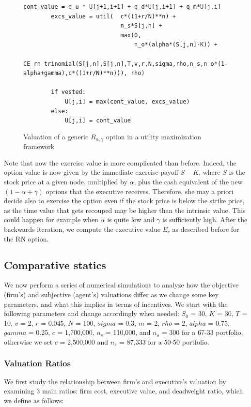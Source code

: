 \begin{figure}[H]
    \begin{lstlisting}[breaklines, basicstyle=\ttfamily\small]
        cont_value = q_u * U[j+1,i+1] + q_d*U[j,i+1] + q_m*U[j,i]
        excs_value = util(  c*((1+r/N)**n) +              
                            n_s*S[j,n] + 
                            max(0, 
                                n_o*(alpha*(S[j,n]-K)) + 
                                CE_rn_trinomial(S[j,n],S[j,n],T,v,r,N,sigma,rho,n_s,n_o*(1-alpha+gamma),c*((1+r/N)**n))), rho)

        if vested:
            U[j,i] = max(cont_value, excs_value)
        else: 
            U[j,i] = cont_value
    \end{lstlisting}
    \caption{Valuation of a generic $R_{\alpha, \gamma}$ option in a utility maximization framework}
    \label{fig:ce_exec_r}
\end{figure}



Note that now the exercise value is more complicated than before. Indeed, the option value is now given by the immediate exercise payoff $S-K$, where $S$ is the stock price at a given node, multiplied by $\alpha$, plus the cash equivalent of the new $(1-\alpha+\gamma)$ options that the executive receives. Therefore, she may a priori decide also to exercise the option even if the stock price is below the strike price, as the time value that gets recouped may be higher than the intrinsic value. This could happen for example when $\alpha$ is quite low and $\gamma$ is sufficiently high. 
After the backwards iteration, we compute the executive value $E_c$ as described before for the RN option.

\subsection{Comparative statics}
We now perform a series of numerical simulations to analyze how the objective (firm's) and subjective (agent's) valuations differ as we change some key parameters, and what this implies in terms of incentives. We start with the following parameters and change accordingly when needed: $S_0$ = 30, $K$ = 30, $T$ = 10, $v$ = 2, $r$ = 0.045, $N$ = 100, $sigma$ = 0.3, $m$ = 2, $rho$ = 2, $alpha$ = 0.75, $gamma$ = 0.25, $c$ = 1,700,000, $n_s$ = 110,000, and $n_o$ = 300 for a 67-33 portfolio, otherwise we set $c$ = 2,500,000 and $n_s$ = 87,333 for a 50-50 portfolio.

\subsubsection*{Valuation Ratios}
We first study the relationship between firm's and executive's valuation by examining 3 main ratios: firm cost, executive value, and deadweight ratio, which we define as follows:

